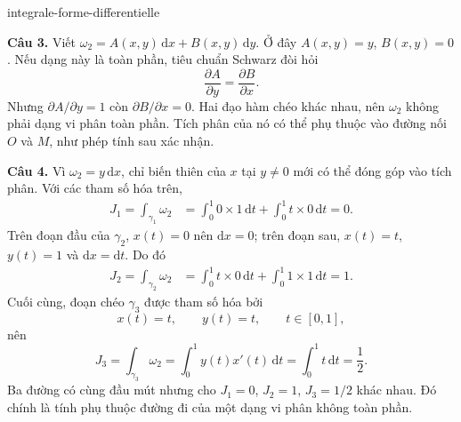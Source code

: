\begin{exo}{integrale-forme-differentielle}
\begin{solution}
\textbf{Câu 3.} Viết $\omega_2=A(x,y)\,\mathrm{d}x+B(x,y)\,\mathrm{d}y$.
Ở đây $A(x,y)=y$, $B(x,y)=0$. Nếu dạng này là toàn phần, tiêu chuẩn Schwarz đòi hỏi
\[
\frac{\partial A}{\partial y}=\frac{\partial B}{\partial x}.
\]
Nhưng $\partial A/\partial y=1$ còn $\partial B/\partial x=0$. Hai đạo hàm chéo
khác nhau, nên $\omega_2$ không phải dạng vi phân toàn phần. Tích phân của nó có thể
phụ thuộc vào đường nối $O$ và $M$, như phép tính sau xác nhận.

\textbf{Câu 4.} Vì $\omega_2=y\,\mathrm{d}x$, chỉ biến thiên của $x$ tại $y\ne0$
mới có thể đóng góp vào tích phân. Với các tham số hóa trên,
\[
\begin{aligned}
J_1=\int_{\gamma_1}\omega_2
&=\int_0^1 0\times1\,\mathrm{d}t+\int_0^1 t\times0\,\mathrm{d}t=0.
\end{aligned}
\]
Trên đoạn đầu của $\gamma_2$, $x(t)=0$ nên $\mathrm{d}x=0$; trên đoạn sau,
$x(t)=t$, $y(t)=1$ và $\mathrm{d}x=\mathrm{d}t$. Do đó
\[
\begin{aligned}
J_2=\int_{\gamma_2}\omega_2
&=\int_0^1 t\times0\,\mathrm{d}t+\int_0^1 1\times1\,\mathrm{d}t=1.
\end{aligned}
\]
Cuối cùng, đoạn chéo $\gamma_3$ được tham số hóa bởi
\[
x(t)=t,\qquad y(t)=t,\qquad t\in[0,1],
\]
nên
\[
J_3=\int_{\gamma_3}\omega_2
=\int_0^1y(t)x'(t)\,\mathrm{d}t
=\int_0^1t\,\mathrm{d}t=\frac12.
\]
Ba đường có cùng đầu mút nhưng cho $J_1=0$, $J_2=1$, $J_3=1/2$ khác nhau.
Đó chính là tính phụ thuộc đường đi của một dạng vi phân không toàn phần.
\end{solution}
\end{exo}

